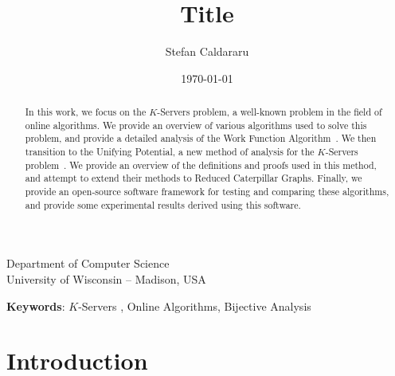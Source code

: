 \documentclass[11pt]{article}
\title{Title}
\author[1]{Stefan Caldararu}
\affil[1]{Undergraduate Student with Department of Computer Science, UW-Madison}
\date{\today}                     %
\newcommand{\KS}{$K$-Servers }
\theoremstyle{definition}
\begin{document}
\maketitle

\begin{center}
	Department of Computer Science\\
	University of Wisconsin -- Madison, USA
\end{center}
\vspace{1.5in}
\begin{abstract} 
	In this work, we focus on the \KS problem, a well-known problem in the field of online algorithms. We provide an overview of various algorithms used to solve this problem, and provide a detailed analysis of the Work Function Algorithm~\cite{KS1990, OnlineComp1998}. We then transition to the Unifying Potential, a new method of analysis for the \KS problem~\cite{unifyingPotential2021}. We provide an overview of the definitions and proofs used in this method, and attempt to extend their methods to Reduced Caterpillar Graphs. Finally, we provide an open-source software framework for testing and comparing these algorithms, and provide some experimental results derived using this software.
\end{abstract}

{\textbf{Keywords}}: \KS, Online Algorithms, Bijective Analysis

\newpage 
\tableofcontents

\newpage

\section{Introduction}
\label{sec:intro}

\end{document}
